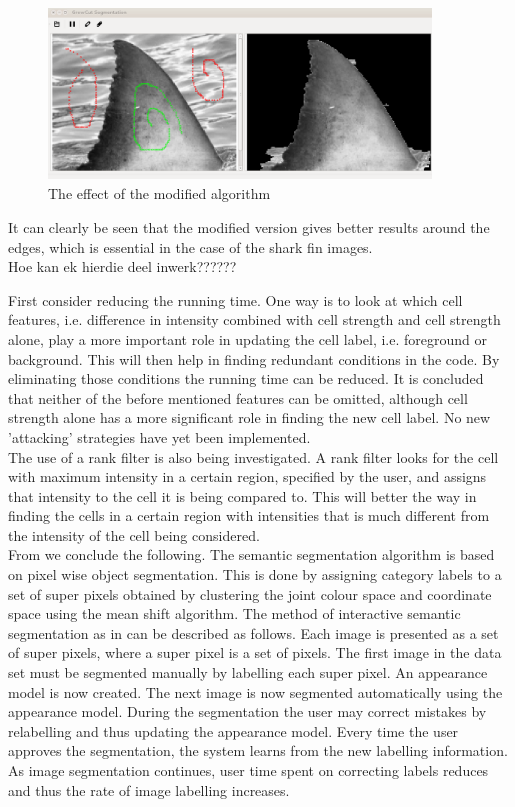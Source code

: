 \documentclass[a4paper,10pt]{article}
\begin{document}
\begin{figure}[H]
 \centering
 \includegraphics[width=4in, height=1.8in]{haaim}
 \caption{The effect of the modified algorithm}
 \label{fin}
\end{figure}

\noindent It can clearly be seen that the modified version gives better results around the edges, which is essential in the case of the shark fin images. \\ 

Hoe kan ek hierdie deel inwerk??????

First consider reducing the running time.  One way is to look at which cell features, i.e. difference in intensity combined with cell strength 
and cell strength alone, play a more important role in updating the cell label, i.e. foreground or background.   This will then help in finding 
redundant conditions in the code.  By eliminating those conditions the running time can be reduced.  It is concluded that neither of the before
mentioned features can be omitted, although cell strength alone has a more significant role in finding the new cell label.  No new 'attacking' 
strategies have yet been implemented. \\

The use of a rank filter is also being investigated.  A rank filter looks for the cell with maximum intensity in a certain region, specified by the user, 
and assigns that intensity to the cell it is being compared to.  This will better the way in finding the cells in a certain region with intensities that 
is much different from the intensity of the cell being considered. \\  

\noindent From \cite{RF} we conclude the following.  The semantic segmentation algorithm is based on pixel wise object segmentation.  This is done by 
assigning category labels to a set of super pixels obtained by clustering the joint colour space and coordinate space using the mean shift algorithm.
The method of interactive semantic segmentation as in \cite{RF} can be described as follows.  Each image is presented as a set of super pixels, where 
a super pixel is a set of pixels.  The first image in the data set must be segmented manually by labelling each super pixel.  An appearance model is 
now created.  The next image is now segmented automatically using the appearance model.  During the segmentation the user may correct mistakes by 
relabelling and thus updating the appearance model.  Every time the user approves the segmentation, the system learns from the new labelling information.
As image segmentation continues, user time spent on correcting labels reduces and thus the rate of image labelling increases.  \\
\end{document}
